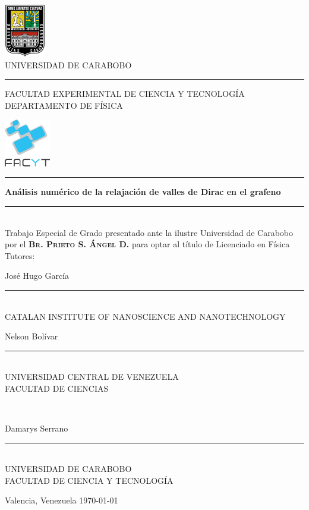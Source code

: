 \begin{titlepage}
	\centering
	\includegraphics[height=2.3cm]{./img/logo-uc}\\[0.5ex]
	{\FuturaRenner UNIVERSIDAD DE CARABOBO}\\[.5ex]
	\rule{8cm}{0.1pt}
	\begin{flushright}
		\noindent\FuturaRenner
		\parbox[b][2.08cm][t]{\dimexpr\linewidth-2.11825cm\relax}{%
			\flushleft FACULTAD EXPERIMENTAL DE CIENCIA Y TECNOLOGÍA\\\vfil
			DEPARTAMENTO DE FÍSICA}
		\includegraphics[width=2cm]{./img/facyt}
	\end{flushright}
	\vspace*{3ex}
	\rule{\textwidth}{1pt}\par
	\vspace{0.5\baselineskip}
	{\huge\bfseries Análisis numérico de la relajación de valles de Dirac en el
		grafeno\par}\vspace{0.5\baselineskip}
	\rule{\textwidth}{1pt}\\[3ex]
	{\Large Trabajo Especial de Grado presentado ante la ilustre Universidad de
		Carabobo por el \textsc{\bfseries Br. Prieto S. Ángel D.} para optar al
		título de Licenciado en Física}\\[3ex]
	{\large Tutores:}\\[3ex]
	\begin{minipage}{0.49\linewidth}
		\centering\noindent
		{\large José Hugo García}
		\rule{0.85\linewidth}{1pt}\\
		{\FuturaRenner \uppercase{Catalan Institute of Nanoscience and Nanotechnology}}
	\end{minipage}\hfill
	\begin{minipage}{0.49\linewidth}
		\centering\noindent
		{\large Nelson Bolívar}
		\rule{0.85\linewidth}{1pt}\\
		{\FuturaRenner UNIVERSIDAD CENTRAL DE VENEZUELA\\FACULTAD DE CIENCIAS}
	\end{minipage}\\[3ex]
	\begin{minipage}{0.49\linewidth}
		\centering\noindent
		{\large Damarys Serrano}
		\rule{0.85\linewidth}{1pt}\\
		{\FuturaRenner UNIVERSIDAD DE CARABOBO\\FACULTAD DE CIENCIA Y TECNOLOGÍA}
	\end{minipage}
	\vfill
	{\large Valencia, Venezuela}
	\hfill
	{\large \today}
\end{titlepage}

\tableofcontents
\cleardoublepage
{}
\listoffigures